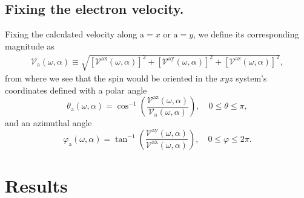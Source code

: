 \documentclass[floatfix,prb,aps,superscriptaddress,showpacs,11pt,preprint,letterpaper]{revtex4}
\begin{document}
\subsection{Fixing the electron velocity.}\label{sec:theory-fixvel}

Fixing the calculated velocity along $\mathrm{a}=x$ or $\mathrm{a}=y$, we
define its corresponding magnitude as
\begin{align}
\mathcal{V}_{\mathrm{a}}(\omega,\alpha) \equiv 
\sqrt { 
[\mathcal{V}^{\mathrm{ax}}(\omega,\alpha)]^{2} +
[\mathcal{V}^{\mathrm{ay}}(\omega,\alpha)]^{2} +
[\mathcal{V}^{\mathrm{az}}(\omega,\alpha)]^{2} 
},
\label{eq:vv-mag}
\end{align}
from where we see that the spin would be oriented in the $xyz$ system's
coordinates defined with a polar angle
\begin{equation}
\theta_{\mathrm{a}}  (\omega,\alpha) = 
\cos^{-1} \left( \frac{\mathcal{V}^{\mathrm{az}}(\omega,\alpha)}
{\mathcal{V}_{\mathrm{a}}(\omega,\alpha)} \right),
 \quad 0 \leq \theta \leq \pi, 
\label{eq:polar-ang}
\end{equation}
and an azimuthal angle
\begin{equation}
\varphi_{\mathrm{a}} (\omega,\alpha) =
\tan^{-1} \left( \frac{\mathcal{V}^{\mathrm{ay}}(\omega,\alpha)}
{\mathcal{V}^{\mathrm{ax}}(\omega,\alpha)} \right),
\quad 0 \leq \varphi \leq 2\pi.
\label{eq:azimuthal-ang} 
\end{equation} 

\section{Results}
\label{sec:results}
\end{document}
